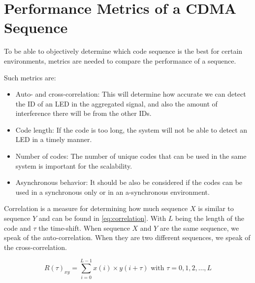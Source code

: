 
\section{Performance Metrics of a CDMA Sequence}
\label{sec:performance-metrics-cdma}

To be able to objectively determine which code sequence is the best for certain environments, metrics are needed to compare the performance of a sequence.


Such metrics are: 

\begin{itemize}

	\item Auto- and cross-correlation: This will determine how accurate we can detect the ID of an LED in the aggregated signal, and also the amount of interference there will be from the other IDs.

	\item Code length: If the code is too long, the system will not be able to detect an LED in a timely manner.

	\item Number of codes: The number of unique codes that can be used in the same system is important for the scalability.

	\item Asynchronous behavior: It should be also be considered if the codes can be used in a synchronous only or in an a-synchronous environment.

\end{itemize}



Correlation is a measure for determining how much sequence $X$ is similar to sequence $Y$ and can be found in \autoref{eq:correlation}.
With $L$ being the length of the code and $\tau$ the time-shift.
When sequence $X$ and $Y$ are the same sequence, we speak of the auto-correlation.
When they are two different sequences, we speak of the cross-correlation. 

\begin{equation}
	R(\tau)_{xy} = \displaystyle\sum_{i = 0} ^ {L - 1} x(i) \times y(i + \tau) {\text{  with $\tau = 0, 1, 2, \dotsc, L$}}
	\label{eq:correlation}
\end{equation}




